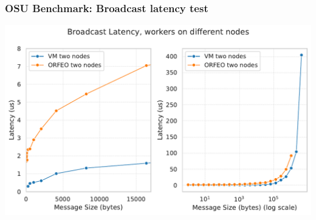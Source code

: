 \documentclass[xcolor=table,fontsize=10pt]{beamer}
\begin{document}
\begin{frame}
	\frametitle{OSU Benchmark: Broadcast latency test}
	\includegraphics[width=\textwidth]{broadcast-two-nodes.pdf}
\end{frame}


% 
% 
\end{document}

